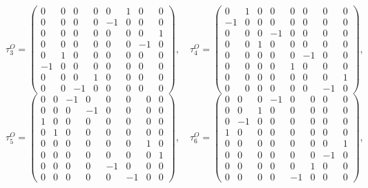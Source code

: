 \documentclass[10pt,a4paper]{article}
\begin{document}
\begin{equation*}
\tau^{O}_3=\begin{pmatrix}0 & 0 & 0 & 0 & 0 & 1 & 0 & 0 \\ 0 & 0 & 0 & 0 & -1 & 0 & 0 & 0 \\ 0 & 0 & 0 & 0 & 0 & 0 & 0 & 1 \\ 0 & 0 & 0 & 0 & 0 & 0 & -1 & 0 \\ 0 & 1 & 0 & 0 & 0 & 0 & 0 & 0 \\ -1 & 0 & 0 & 0 & 0 & 0 & 0 & 0 \\ 0 & 0 & 0 & 1 & 0 & 0 & 0 & 0 \\ 0 & 0 & -1 & 0 & 0 & 0 & 0 & 0\end{pmatrix},\quad \tau^{O}_4=\begin{pmatrix}0 & 1 & 0 & 0 & 0 & 0 & 0 & 0 \\ -1 & 0 & 0 & 0 & 0 & 0 & 0 & 0 \\ 0 & 0 & 0 & -1 & 0 & 0 & 0 & 0 \\ 0 & 0 & 1 & 0 & 0 & 0 & 0 & 0 \\ 0 & 0 & 0 & 0 & 0 & -1 & 0 & 0 \\ 0 & 0 & 0 & 0 & 1 & 0 & 0 & 0 \\ 0 & 0 & 0 & 0 & 0 & 0 & 0 & 1 \\ 0 & 0 & 0 & 0 & 0 & 0 & -1 & 0\end{pmatrix},
\end{equation*}
\begin{equation*}
\tau^{O}_5=\begin{pmatrix}0 & 0 & -1 & 0 & 0 & 0 & 0 & 0 \\ 0 & 0 & 0 & -1 & 0 & 0 & 0 & 0 \\ 1 & 0 & 0 & 0 & 0 & 0 & 0 & 0 \\ 0 & 1 & 0 & 0 & 0 & 0 & 0 & 0 \\ 0 & 0 & 0 & 0 & 0 & 0 & 1 & 0 \\ 0 & 0 & 0 & 0 & 0 & 0 & 0 & 1 \\ 0 & 0 & 0 & 0 & -1 & 0 & 0 & 0 \\ 0 & 0 & 0 & 0 & 0 & -1 & 0 & 0\end{pmatrix},\quad \tau^{O}_6=\begin{pmatrix}0 & 0 & 0 & -1 & 0 & 0 & 0 & 0 \\ 0 & 0 & 1 & 0 & 0 & 0 & 0 & 0 \\ 0 & -1 & 0 & 0 & 0 & 0 & 0 & 0 \\ 1 & 0 & 0 & 0 & 0 & 0 & 0 & 0 \\ 0 & 0 & 0 & 0 & 0 & 0 & 0 & 1 \\ 0 & 0 & 0 & 0 & 0 & 0 & -1 & 0 \\ 0 & 0 & 0 & 0 & 0 & 1 & 0 & 0 \\ 0 & 0 & 0 & 0 & -1 & 0 & 0 & 0\end{pmatrix},
\end{equation*}
\end{document}
